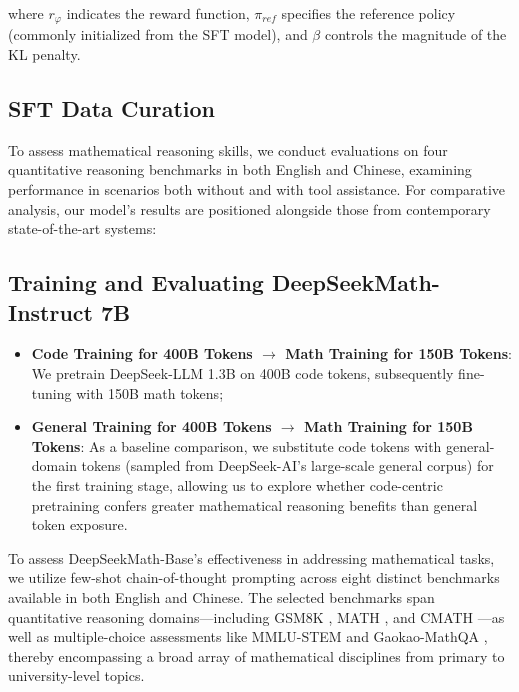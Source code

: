 where $r_\varphi$ indicates the reward function, $\pi_{ref}$ specifies the reference policy (commonly initialized from the SFT model), and $\beta$ controls the magnitude of the KL penalty.

\subsection{SFT Data Curation}

To assess mathematical reasoning skills, we conduct evaluations on four quantitative reasoning benchmarks in both English and Chinese, examining performance in scenarios both without and with tool assistance. For comparative analysis, our model's results are positioned alongside those from contemporary state-of-the-art systems:

\subsection{Training and Evaluating DeepSeekMath-Instruct 7B}

\begin{itemize}[topsep=0pt]
    \item \textbf{Code Training for 400B Tokens $\rightarrow$ Math Training for 150B Tokens}: We pretrain DeepSeek-LLM 1.3B on 400B code tokens, subsequently fine-tuning with 150B math tokens;
    \item \textbf{General Training for 400B Tokens $\rightarrow$ Math Training for 150B Tokens}: As a baseline comparison, we substitute code tokens with general-domain tokens (sampled from DeepSeek-AI’s large-scale general corpus) for the first training stage, allowing us to explore whether code-centric pretraining confers greater mathematical reasoning benefits than general token exposure.
\end{itemize}

To assess DeepSeekMath-Base’s effectiveness in addressing mathematical tasks, we utilize few-shot chain-of-thought prompting \citep{cot} across eight distinct benchmarks available in both English and Chinese. The selected benchmarks span quantitative reasoning domains—including GSM8K \citep{gsm8k}, MATH \citep{MATH}, and CMATH \citep{wei2023cmath}—as well as multiple-choice assessments like MMLU-STEM \citep{mmlu} and Gaokao-MathQA \citep{agieval}, thereby encompassing a broad array of mathematical disciplines from primary to university-level topics.

